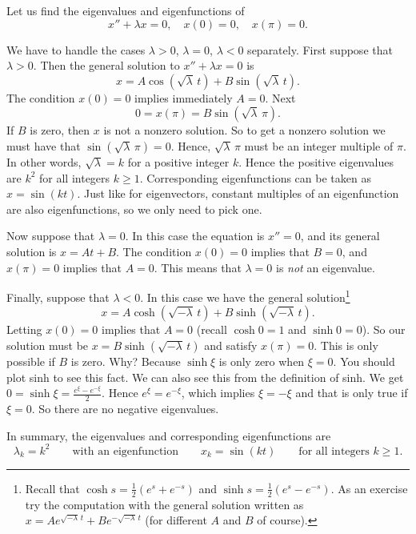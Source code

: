 \begin{example} \label{bvp:eig1ex}
Let us find the eigenvalues and eigenfunctions of
\begin{equation*}
x'' + \lambda x = 0, \quad x(0) = 0, \quad x(\pi) = 0 .
\end{equation*}

We have to handle
the cases $\lambda > 0$, $\lambda = 0$, $\lambda < 0$ separately.
First suppose that $\lambda > 0$.  Then
the general solution to $x''+\lambda x = 0$ is
\begin{equation*}
x = A \cos ( \sqrt{\lambda}\, t) + B \sin ( \sqrt{\lambda}\, t).
\end{equation*}
The condition $x(0) = 0$ implies immediately $A = 0$.
Next
\begin{equation*}
0 = x(\pi) = B \sin ( \sqrt{\lambda}\, \pi ) .
\end{equation*}
If $B$ is zero, then $x$ is not a nonzero solution.  So to get a nonzero
solution we must have that $\sin ( \sqrt{\lambda}\, \pi) = 0$.  Hence,
$\sqrt{\lambda}\, \pi$ must be an integer multiple of $\pi$.  In other words,
 $\sqrt{\lambda} = k$ for a positive integer $k$.
Hence the positive eigenvalues are
$k^2$ for all integers $k \geq 1$.  Corresponding eigenfunctions
can be taken as $x=\sin (k t)$.  Just like for eigenvectors, constant
multiples of an eigenfunction are also eigenfunctions,
so we only need to pick one.

Now suppose that $\lambda = 0$.  In this case the equation is $x'' = 0$,
and its general solution is $x = At + B$.  The condition $x(0) = 0$ implies
that $B=0$, and $x(\pi) = 0$ implies that $A = 0$.  This means that $\lambda
= 0$ is \emph{not} an eigenvalue.

Finally, suppose that $\lambda < 0$.  In this case we have the general
solution\footnote{Recall that
$\cosh s = \frac{1}{2}(e^s+e^{-s})$
and
$\sinh s = \frac{1}{2}(e^s-e^{-s})$.  As an exercise
try the computation with the general solution written as
$x = A e^{\sqrt{-\lambda}\, t} + B e^{-\sqrt{-\lambda}\, t}$ (for
different $A$ and $B$ of course).}
\begin{equation*}
x = A \cosh ( \sqrt{-\lambda}\, t) + B \sinh ( \sqrt{-\lambda}\, t ) .
\end{equation*}
Letting $x(0) = 0$ implies that $A = 0$ (recall $\cosh 0 = 1$ and $\sinh 0 =
0$).  So our solution must be $x = B \sinh ( \sqrt{-\lambda}\, t )$ and satisfy
$x(\pi) = 0$.  This is only possible if $B$ is zero.  Why?  Because
$\sinh \xi$ is only zero when $\xi=0$.  You should plot sinh to see this
fact.
We can also see this from the definition of sinh.
We get $0 = \sinh \xi = \frac{e^\xi -
e^{-\xi}}{2}$.  Hence $e^\xi = e^{-\xi}$, which implies $\xi = -\xi$ and that is only
true if $\xi=0$.  So there are no negative eigenvalues.

In summary, the eigenvalues and corresponding eigenfunctions are
\begin{equation*}
\lambda_k = k^2 \qquad \text{with an eigenfunction} \qquad x_k = \sin (k t)
\qquad \text{for all integers } k \geq 1 .
\end{equation*}
\end{example}

